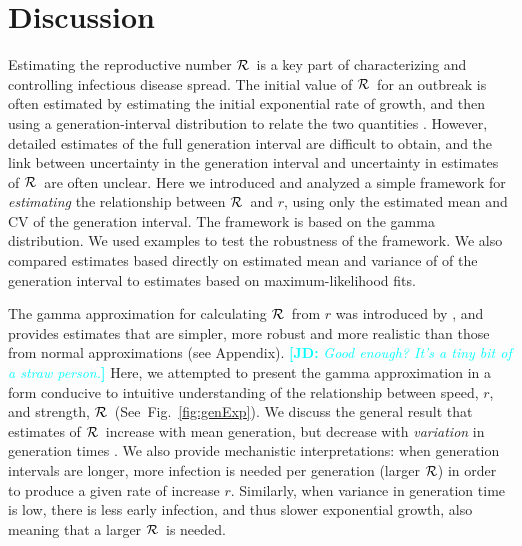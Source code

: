 \documentclass[12pt]{article}
\newcommand{\RR}{\ensuremath{{\cal R}}}
\newcommand{\fref}[1]{Fig.~\ref{fig:#1}}
\newcommand{\comment}[3]{\textcolor{#1}{\textbf{[#2: }\textit{#3}\textbf{]}}}
\newcommand{\jd}[1]{\comment{cyan}{JD}{#1}}
\begin{document}
\section{Discussion}

Estimating the reproductive number \RR\ is a key part of characterizing and controlling infectious disease spread. The initial value of \RR\ for an outbreak is often estimated by estimating the initial exponential rate of growth, and then using a generation-interval distribution to relate the two quantities \cite{WallLips07,Sven07,Nish10,Sven15}.
However, detailed estimates of the full generation interval are difficult to obtain, and the link between uncertainty in the generation interval and uncertainty in estimates of \RR\ are often unclear.
Here we introduced and analyzed a simple framework for \emph{estimating} the relationship between \RR\ and $r$, using only the estimated mean and CV of the generation interval. The framework is based on the gamma distribution. We used examples to test the robustness of the framework. We also compared estimates based directly on estimated mean and variance of of the generation interval to estimates based on maximum-likelihood fits.

The gamma approximation for calculating \RR\ from $r$ was introduced by \cite{NishCast09}, and  provides estimates that are simpler, more robust and more realistic than those from normal approximations (see Appendix). \jd{Good enough? It's a tiny bit of a straw person.} 
Here, we attempted to present the gamma approximation in a form conducive to intuitive understanding of the relationship between speed, $r$, and strength, \RR\ (See~\fref{genExp}).
We discuss the general result that estimates of \RR\ increase with mean generation, but decrease with \emph{variation} in generation times \cite{WallLips07}.
We also provide mechanistic interpretations: when generation intervals are longer, more infection is needed per generation (larger \RR)  in order to produce a given rate of increase $r$. Similarly, when variance in generation time is low, there is less early infection, and thus slower exponential growth, also meaning that a larger \RR\ is needed. 
\end{document}
